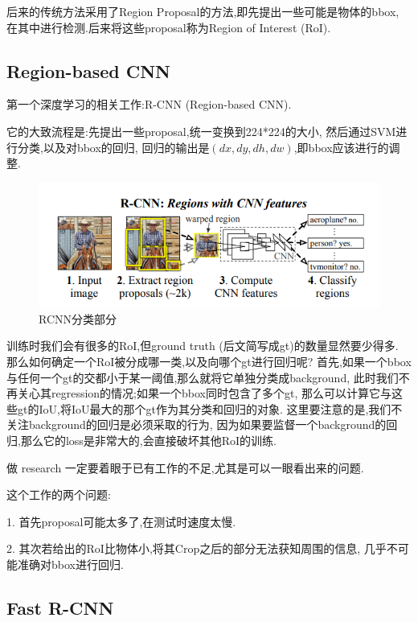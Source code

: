 后来的传统方法采用了Region Proposal的方法,即先提出一些可能是物体的bbox,
在其中进行检测.后来将这些proposal称为Region of Interest (RoI).

\subsection{Region-based CNN}

第一个深度学习的相关工作\cite{RCNN}:R-CNN (Region-based CNN).

它的大致流程是:先提出一些proposal,统一变换到224*224的大小,
然后通过SVM进行分类,以及对bbox的回归,
回归的输出是$(dx, dy, dh, dw)$,即bbox应该进行的调整.

\begin{figure}[htbp]
    \centering
    \includegraphics[scale=0.9]{figures/RCNN_classification.png}
    \caption{RCNN分类部分}
\end{figure}

训练时我们会有很多的RoI,但ground truth (后文简写成gt)的数量显然要少得多.
那么如何确定一个RoI被分成哪一类,以及向哪个gt进行回归呢?
首先,如果一个bbox与任何一个gt的交都小于某一阈值,那么就将它单独分类成background,
此时我们不再关心其regression的情况;如果一个bbox同时包含了多个gt,
那么可以计算它与这些gt的IoU,将IoU最大的那个gt作为其分类和回归的对象.
这里要注意的是,我们不关注background的回归是必须采取的行为,
因为如果要监督一个background的回归,那么它的loss是非常大的,会直接破坏其他RoI的训练.

做 research 一定要着眼于已有工作的不足,尤其是可以一眼看出来的问题.

这个工作的两个问题:

1. 首先proposal可能太多了,在测试时速度太慢.

2. 其次若给出的RoI比物体小,将其Crop之后的部分无法获知周围的信息,
几乎不可能准确对bbox进行回归.

\subsection{Fast R-CNN}

